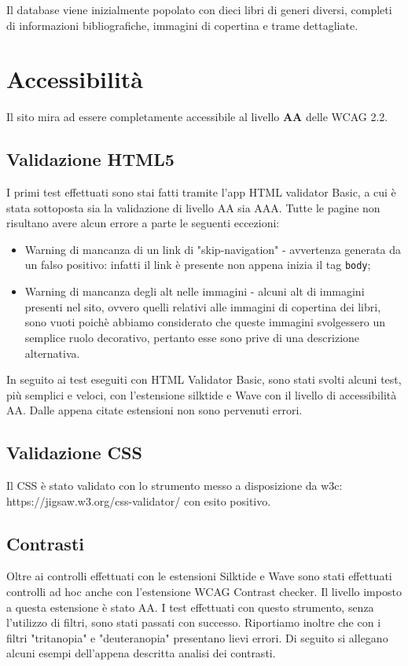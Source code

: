 \documentclass{article}
\begin{document}
Il database viene inizialmente popolato con dieci libri di generi diversi, completi di informazioni bibliografiche, immagini di copertina e trame dettagliate.


\section{Accessibilità}
Il sito mira ad essere completamente accessibile al livello \textbf{AA} delle WCAG 2.2. 
\subsection{Validazione HTML5}
I primi test effettuati sono stai fatti tramite l'app HTML validator Basic, a cui è stata sottoposta sia la validazione di livello AA sia AAA. Tutte le pagine non risultano avere alcun errore a parte le seguenti eccezioni:
\begin{itemize}
    \item Warning di mancanza di un link di "skip-navigation" - avvertenza generata da un falso positivo: infatti il link è presente non appena inizia il tag \texttt{body};
    \item Warning di mancanza degli alt nelle immagini - alcuni alt di immagini presenti nel sito, ovvero quelli relativi alle immagini di copertina dei libri, sono vuoti poichè abbiamo considerato che queste immagini svolgessero un semplice ruolo decorativo, pertanto esse sono prive di una descrizione alternativa.
\end{itemize}

In seguito ai test eseguiti con HTML Validator Basic, sono stati svolti alcuni test, più semplici e veloci, con l'estensione silktide e Wave con il livello di accessibilità AA. Dalle appena citate estensioni non sono pervenuti errori.

\subsection{Validazione CSS}
Il CSS è stato validato con lo strumento messo a disposizione da w3c: https://jigsaw.w3.org/css-validator/ con esito positivo.

\subsection{Contrasti}
Oltre ai controlli effettuati con le estensioni Silktide e Wave sono stati effettuati controlli ad hoc anche con l'estensione WCAG Contrast checker. Il livello imposto a questa estensione è stato AA. I test effettuati con questo strumento, senza l'utilizzo di filtri, sono stati passati con successo. Riportiamo inoltre che con i filtri "tritanopia" e "deuteranopia" presentano lievi errori. Di seguito si allegano alcuni esempi dell'appena descritta analisi dei contrasti.
\end{document}
